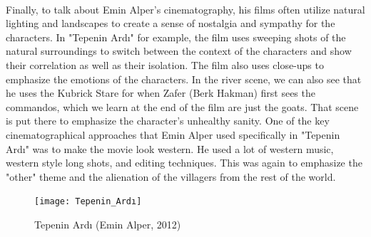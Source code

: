 \documentclass[12pt]{article}
\begin{document}
\\
Finally, to talk about Emin Alper's cinematography, his films often utilize natural lighting and landscapes to create a sense of nostalgia and sympathy for the characters.
In "Tepenin Ardı" for example, the film uses sweeping shots of the natural surroundings to switch between the context of the characters and show their correlation as well as their isolation. The film also uses close-ups to emphasize the emotions of the characters.
In the river scene, we can also see that he uses the Kubrick Stare for when Zafer (Berk Hakman) first sees the commandos, which we learn at the end of the film are just the goats. That scene is put there to emphasize the character's unhealthy sanity.
One of the key cinematographical approaches that Emin Alper used specifically in "Tepenin Ardı" was to make the movie look western. He used a lot of western music, western style long shots, and editing techniques. This was again to emphasize the "other" theme
and the alienation of the villagers from the rest of the world.
\\

\begin{figure}[h]
        \begin{center}
                \texttt{[image: Tepenin\_Ardı]}
                \caption{Tepenin Ardı (Emin Alper, 2012)}
        \end{center}
\end{figure}

\FloatBarrier
\end{document}
